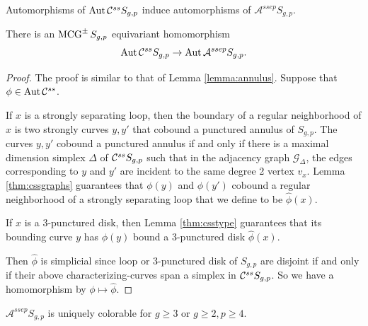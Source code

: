 \begin{lemma}
  \label{lem:csstoass}
  Automorphisms of $\operatorname{Aut}  \mathcal C^{{ss}}  S_{g,p}$ induce automorphisms of $\mathcal A^{ssep} S_{g,p}$.

  There is an $\operatorname{MCG}^\pm S_{g,p}$ equivariant homomorphism
  $$\operatorname{Aut}  \mathcal C^{{ss}}  S_{g,p} \to \operatorname{Aut} \mathcal A^{ssep} S_{g,p}.$$
\end{lemma}
\begin{proof}
  The proof is similar to that of Lemma \ref{lemma:annulus}.
  Suppose that $\phi \in \operatorname{Aut}  \mathcal C^{{ss}} $.

  If $x$ is a strongly separating loop, then the boundary of a regular neighborhood
  of $x$ is two strongly curves $y,y'$ that cobound a punctured annulus of $S_{g,p}$.
  The curves $y,y'$ cobound a punctured annulus if and only if there is
  a maximal dimension simplex $\Delta$ of $ \mathcal C^{{ss}}  S_{g,p}$ such that in the adjacency graph $\mathcal G_\Delta$,
  the edges corresponding to $y$ and $y'$ are incident to the same degree 2 vertex $v_x$.
  Lemma \ref{thm:cssgraphs} guarantees that $\phi(y)$ and $\phi(y')$ cobound
  a regular neighborhood of a strongly separating loop that we define to be $\hat \phi(x)$.

  If $x$ is a 3-punctured disk, then Lemma \ref{thm:csstype} guarantees that
  its bounding curve $y$ has $\phi(y)$ bound a 3-punctured disk $\hat \phi (x)$.

  Then $\hat \phi$  is simplicial since  loop or 3-punctured disk of $S_{g,p}$
  are disjoint if and only if their above characterizing-curves span a simplex in $ \mathcal C^{{ss}}  S_{g,p}$.
  So we have a homomorphism by $\phi \mapsto \hat \phi$.
\end{proof}

\begin{lemma}
  $\mathcal A^{ssep}  S_{g,p}$ is uniquely colorable for $g\geq 3$ or $g\geq 2, p\geq 4$.
  \label{lem:asscolor}
\end{lemma}

